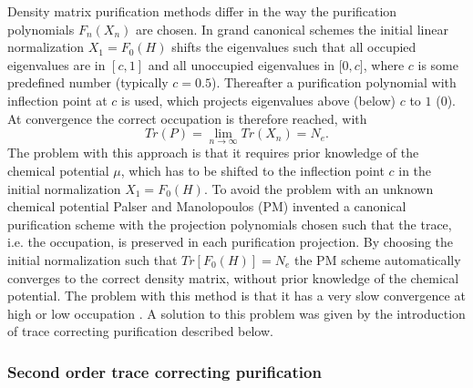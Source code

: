 \documentclass[twocolumn,showpacs,preprintnumbers,amsmath,amssymb]{revtex4}
\begin{document}
Density matrix purification methods differ in the way the purification polynomials $F_n(X_n)$
are chosen. In grand canonical schemes \cite{Palser98,Holas01,NiklassonTC2} the initial linear normalization
$X_1 = F_0(H)$ shifts the  eigenvalues such that all occupied eigenvalues are in $[c,1]$ and
all unoccupied eigenvalues in [$0,c]$, where $c$ is some predefined number (typically $c = 0.5$).
Thereafter a purification polynomial with inflection point at $c$ is used, which projects
eigenvalues above (below) $c$ to $1$ ($0$). At convergence the correct occupation is therefore reached, with
\begin{equation}
Tr(P) = \lim_{n \rightarrow \infty} Tr(X_n) = N_e.
\end{equation}
The problem with this approach is that it requires prior knowledge of the 
chemical potential $\mu$, which has to be shifted to the inflection point $c$ in the initial
normalization $X_1 = F_0(H)$.
To avoid the problem with an unknown chemical potential Palser and Manolopoulos (PM) invented a
canonical purification scheme \cite{Palser98} with the projection polynomials chosen
such that the trace, i.e. the occupation, is preserved in each purification projection.
By choosing the initial normalization such that $Tr[F_0(H)] = N_e$ the PM scheme
automatically converges to the correct density matrix, without prior knowledge of 
the chemical potential.  The problem with this method is that it has a very slow
convergence at high or low occupation \cite{Palser98,NiklassonTC2}.
A solution to this problem was given by the introduction of trace correcting purification \cite{NiklassonTC2}
described below.

\subsubsection{Second order trace correcting purification}
\end{document}
